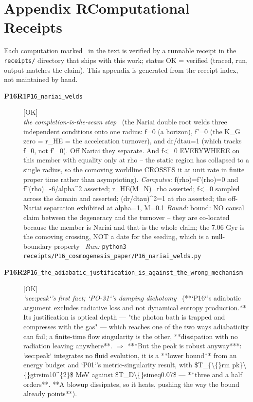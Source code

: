 \clearpage
\section*{Appendix R\quad Computational Receipts}\label{app:receipts}
\small\noindent Each computation marked \rcptmarker\ in the text is verified by a runnable receipt in the \texttt{receipts/} directory that ships with this work; status \textsf{OK} = verified (traced, run, output matches the claim). This appendix is generated from the receipt index, not maintained by hand.\par\medskip
\begingroup\renewcommand{\arraystretch}{1.25}
\begin{description}
\item[\textbf{P16R1}\quad\texttt{P16\_nariai\_welds}]\hfill\textsf{[OK]}\\
\textit{the completion-is-the-seam step} \ (the Nariai double root welds three independent conditions onto one radius: f=0 (a horizon), f'=0 (the K\_G zero = r\_HE = the acceleration turnover), and dr/dtau=1 (which tracks f=0, not f'=0). Off Nariai they separate. And f<=0 EVERYWHERE on this member with equality only at rho -- the static region has collapsed to a single radius, so the comoving worldline CROSSES it at unit rate in finite proper time rather than asymptoting). 
\emph{Computes:} f(rho)=f'(rho)=0 and f''(rho)=-6/alpha\textasciicircum{}2 asserted; r\_HE(M\_N)=rho asserted; f<=0 sampled across the domain and asserted; (dr/dtau)\textasciicircum{}2=1 at rho asserted; the off-Nariai separation exhibited at alpha=1, M=0.1
 \emph{Bound:} bound: NO causal claim between the degeneracy and the turnover -- they are co-located because the member is Nariai and that is the whole claim; the 7.06 Gyr is the comoving crossing, NOT a date for the seeding, which is a null-boundary property
\ \emph{Run:} \texttt{python3 receipts/P16\_cosmogenesis\_paper/P16\_nariai\_welds.py}
\item[\textbf{P16R2}\quad\texttt{P16\_the\_adiabatic\_justification\_is\_against\_the\_wrong\_mechanism}]\hfill\textsf{[OK]}\\
\textit{`sec:peak`'s first fact; `PO-31`'s damping dichotomy} \ (**`P16`'s adiabatic argument excludes radiative loss and not dynamical entropy production.** Its justification is optical depth --- "the photon bath is trapped and compresses with the gas" --- which reaches one of the two ways adiabaticity can fail; a finite-time flow singularity is the other, **dissipation with no radiation leaving anywhere**. \ensuremath{\Rightarrow} ***But the peak is robust anyway***: `sec:peak` integrates no fluid evolution, it is a **lower bound** from an energy budget and `P01`'s metric-singularity result, with \$T\_\{\textbackslash\{\}rm pk\}\textbackslash\{\}gtrsim10\textasciicircum{}\{2\}\$ MeV against \$T\_D\textbackslash\{\}simeq0.07\$ --- **three and a half orders**. **A blowup dissipates, so it heats, pushing the way the bound already points**). 

\end{description}
